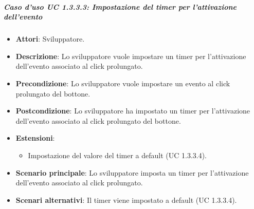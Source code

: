 \subparagraph{Caso d'uso UC 1.3.3.3: Impostazione del timer per l'attivazione dell'evento}

\FloatBarrier
\begin{itemize}
\item\textbf{Attori}: Sviluppatore.
\item\textbf{Descrizione}: Lo sviluppatore vuole impostare un timer per l'attivazione dell'evento associato al click prolungato.
\item\textbf{Precondizione}: Lo sviluppatore vuole impostare un evento al click prolungato del bottone.
\item\textbf{Postcondizione}: Lo sviluppatore ha impostato un timer per l'attivazione dell'evento associato al click prolungato del bottone.
\item \textbf{Estensioni}: 
\begin{itemize}
\item Impostazione del valore del timer a default (UC 1.3.3.4).
\end{itemize}
\item\textbf{Scenario principale}: Lo sviluppatore imposta un timer per l'attivazione dell'evento associato al click prolungato.
\item\textbf{Scenari alternativi}: Il timer viene impostato a default (UC 1.3.3.4).
\end{itemize}
